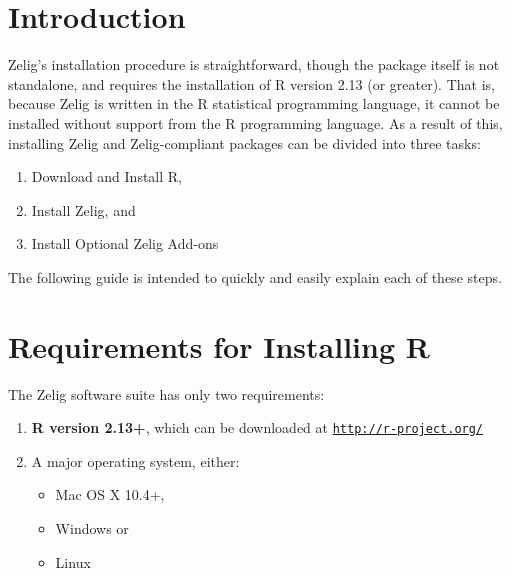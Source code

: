 
%
\newcommand{\CranMirror}[0]{
  \href{http://cran.opensourceresources.org/}{http://cran.opensourceresources.org/}
}

\newcommand{\InstallInstructionsHref}[0]{
  \href{http://cran.r-project.org/doc/manuals/R-admin.html}{http://cran.r-project.org/doc/manuals/R-admin.html}
}

\newcommand{\MacInstallHref}[0]{
\href{http://cran.r-project.org/doc/manuals/R-admin.html\#Installing-R-under-_0028Mac_0029-OS-X}{Mac}
}
\newcommand{\WindowsInstallHref}[0]{
\href{http://cran.r-project.org/doc/manuals/R-admin.html\#Installing-R-under-Windows}{Windows}
}
\newcommand{\UnixInstallHref}[0]{
\href{http://cran.r-project.org/doc/manuals/R-admin.html\#Installing-R-under-Unix_002dalikes}{Unix-alike}
}


\section{Introduction}

Zelig's installation procedure is straightforward, though the package itself is
not standalone, and requires the installation of R version 2.13 (or greater).
That is, because Zelig is written in the R statistical programming language, it
cannot be installed without support from the R programming language. As a
result of this, installing Zelig and Zelig-compliant packages can be divided
into three tasks:

\begin{enumerate}
	\item Download and Install R,
	\item Install Zelig, and
	\item Install Optional Zelig Add-ons
\end{enumerate}

The following guide is intended to quickly and easily explain each of these steps.


%
%
\section{Requirements for Installing R}

The Zelig software suite has only two requirements: 

\begin{enumerate}
	\item {\bf R version 2.13+}, which can be downloaded at \href{http://www.r-project.org/}{\tt http://r-project.org/}
	\item A major operating system, either:
		\begin{itemize}
			\item Mac OS X 10.4+,
			\item Windows or
			\item Linux
		\end{itemize}
\end{enumerate}

